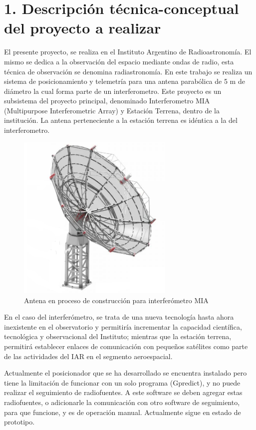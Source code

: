 \documentclass[11pt, %
codirector, %
]{charter}
\begin{document}
\section{1. Descripción técnica-conceptual del proyecto a realizar}
\label{sec:descripcion}
El presente proyecto, se realiza en el Instituto Argentino de Radioastronomía. El mismo se dedica a la observación del espacio mediante ondas de radio, esta técnica de observación se denomina radiastronomía. En este trabajo se realiza un sistema de posicionamiento y telemetría para una antena parabólica de 5 m de diámetro la cual forma parte de un interferometro. Este proyecto es un subsistema del proyecto principal, denominado Interferometro MIA (Multipurpose Interferometric Array) y Estación Terrena, dentro de la institución. La antena perteneciente a la estación terrena es idéntica a la del interferometro. 
\begin{figure}[H]
	\centering 
	\includegraphics[height = 8cm ]{Figuras/seccion_1/antena_MIA.png}
	\caption{Antena en proceso de construcción para interferómetro MIA}
	\label{fig:antena_mia}
\end{figure}


En el caso del interferómetro, se trata de una nueva tecnología hasta ahora inexistente en el observatorio y permitiría incrementar la capacidad científica, tecnológica y observacional del Instituto; mientras que la estación terrena, permitirá establecer enlaces de comunicación con pequeños satélites como parte de las actividades del IAR en el segmento aeroespacial.

Actualmente el posicionador que se ha desarrollado se encuentra instalado pero tiene la limitación de funcionar con un solo programa (Gpredict), y no puede realizar el seguimiento de radiofuentes. A este software se deben agregar estas radiofuentes, o adicionarle la comunicación con otro software de seguimiento, para que funcione, y es de operación manual. Actualmente sigue en estado de prototipo.  
\end{document}
